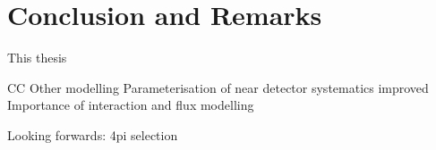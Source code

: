 \chapter{Conclusion and Remarks}
\label{chap:conclusion}
This thesis

CC Other modelling
Parameterisation of near detector systematics improved
Importance of interaction and flux modelling

Looking forwards: 4pi selection
